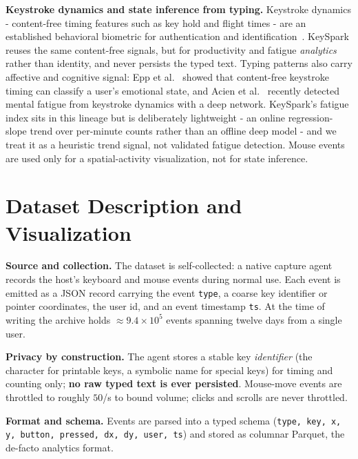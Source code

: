 \documentclass[conference]{IEEEtran}
\begin{document}
\textbf{Keystroke dynamics and state inference from typing.} Keystroke
dynamics - content-free timing features such as key hold and flight
times - are an established behavioral biometric for authentication and
identification~\cite{monrose2000keystroke,killourhy2009comparing,teh2013survey}.
KeySpark reuses the same content-free signals, but for productivity
and fatigue \emph{analytics} rather than identity, and never persists the
typed text. Typing patterns also carry affective and cognitive signal:
Epp et al.~\cite{epp2011identifying} showed that content-free keystroke
timing can classify a user's emotional state, and Acien et
al.~\cite{acien2022fatigue} recently detected mental fatigue from
keystroke dynamics with a deep network. KeySpark's fatigue index sits
in this lineage but is deliberately lightweight - an online
regression-slope trend over per-minute counts rather than an offline
deep model - and we treat it as a heuristic trend signal, not validated
fatigue detection. Mouse events are used only for a spatial-activity
visualization, not for state inference.

\section{Dataset Description and Visualization}
\label{sec:dataset}

\textbf{Source and collection.} The dataset is self-collected: a native
capture agent records the host's keyboard and mouse events during normal
use. Each event is emitted as a JSON record carrying the event
\texttt{type}, a coarse key identifier or pointer coordinates, the user
id, and an event timestamp \texttt{ts}.
At the time of writing the archive holds $\approx\!9.4\times10^{5}$
events spanning twelve days from a single user.

\textbf{Privacy by construction.} The agent stores a stable key
\emph{identifier} (the character for printable keys, a symbolic name for
special keys) for timing and counting only; \textbf{no raw typed text is
ever persisted}. Mouse-move events are throttled to roughly $50$/s to
bound volume; clicks and scrolls are never throttled.

\textbf{Format and schema.} Events are parsed into a typed schema
(\texttt{type, key, x, y, button, pressed, dx, dy, user, ts}) and stored
as columnar Parquet, the de-facto analytics format.
\end{document}
